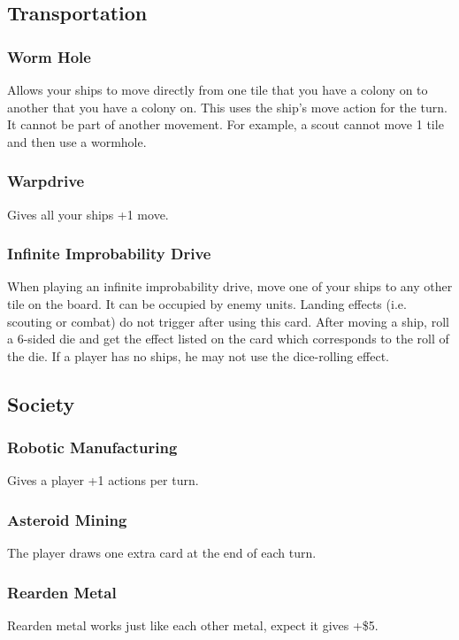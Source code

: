 \documentclass[12pt]{article} %
\begin{document}
\subsection{Transportation}

\subsubsection{Worm Hole}
Allows your ships to move directly from one tile that you have a colony on to another that you have a colony on.   This uses the ship's move action for the turn.  It cannot be part of another movement.  For example, a scout cannot move 1 tile and then use a wormhole.

\subsubsection{Warpdrive}
Gives all your ships +1 move.

\subsubsection{Infinite Improbability Drive}
When playing an infinite improbability drive, move one of your ships to any other tile on the board.  It can be occupied by enemy units.  Landing effects (i.e. scouting or combat) do not trigger after using this card.  After moving a ship, roll a 6-sided die and get the effect listed on the card which corresponds to the roll of the die.  If a player has no ships, he may not use the dice-rolling effect.

\subsection{Society}

\subsubsection{Robotic Manufacturing}
Gives a player +1 actions per turn.

\subsubsection{Asteroid Mining}
The player draws one extra card at the end of each turn.

\subsubsection{Rearden Metal}
Rearden metal works just like each other metal, expect it gives +\$5.    
\end{document}
